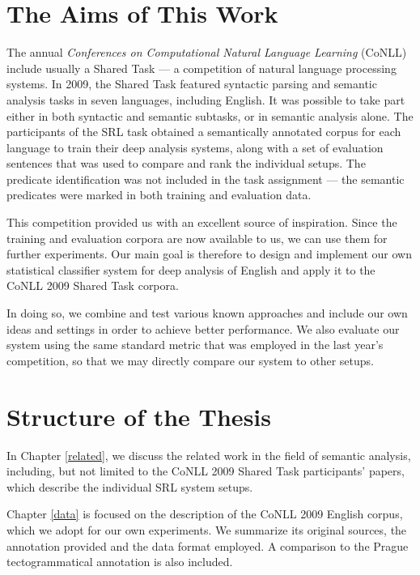\documentclass[12pt,notitlepage,a4paper]{report}
\begin{document}
\section{The Aims of This Work}\label{aims}

The annual \emph{Conferences on Computational Natural Language Learning} (CoNLL) include usually a Shared Task --- a competition of natural language processing systems. In 2009, the Shared Task \citep{hajic09} featured syntactic parsing and semantic analysis tasks in seven languages, including English. It was possible to take part either in both syntactic and semantic subtasks, or in semantic analysis alone. The participants of the SRL task obtained a semantically annotated corpus for each language to train their deep analysis systems, along with a set of evaluation sentences that was used to compare and rank the individual setups. The predicate identification was not included in the task assignment --- the semantic predicates were marked in both training and evaluation data.

This competition provided us with an excellent source of inspiration. Since the training and evaluation corpora are now available to us, we can use them for further experiments. Our main goal is therefore to design and implement our own statistical classifier system for deep analysis of English and apply it to the CoNLL 2009 Shared Task corpora.

In doing so, we combine and test various known approaches and include our own ideas and settings in order to achieve better performance. We also evaluate our system using the same standard metric that was employed in the last year's competition, so that we may directly compare our system to other setups.

\section{Structure of the Thesis}

In Chapter \ref{related}, we discuss the related work in the field of semantic analysis, including, but not limited to the CoNLL 2009 Shared Task participants' papers, which describe the individual SRL system setups.

Chapter \ref{data} is focused on the description of the CoNLL 2009 English corpus, which we adopt for our own experiments. We summarize its original sources, the annotation provided and the data format employed. A comparison to the Prague tectogrammatical annotation \citep{cinkova09} is also included.
\end{document}

